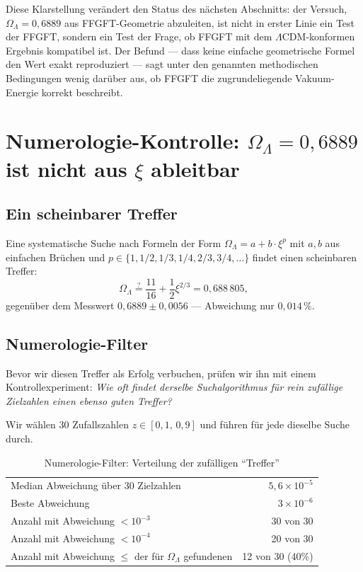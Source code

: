 Diese Klarstellung verändert den Status des nächsten Abschnitts: der Versuch, \(\Omega_\Lambda = 0{,}6889\) aus FFGFT-Geometrie abzuleiten, ist nicht in erster Linie ein Test der FFGFT, sondern ein Test der Frage, ob FFGFT mit dem \(\Lambda\)CDM-konformen Ergebnis kompatibel ist. Der Befund — dass keine einfache geometrische Formel den Wert exakt reproduziert — sagt unter den genannten methodischen Bedingungen wenig darüber aus, ob FFGFT die zugrundeliegende Vakuum-Energie korrekt beschreibt.

\section[Numerologie-Kontrolle: Omega-Lambda nicht aus xi ableitbar]{Numerologie-Kontrolle: \(\Omega_\Lambda = 0{,}6889\) ist nicht aus \(\xi\) ableitbar}
\label{sec:numerologie}

\subsection{Ein scheinbarer Treffer}

Eine systematische Suche nach Formeln der Form \(\Omega_\Lambda = a + b \cdot \xi^p\) mit \(a, b\) aus einfachen Brüchen und \(p \in \{1, 1/2, 1/3, 1/4, 2/3, 3/4, \dots\}\) findet einen scheinbaren Treffer:
\begin{equation}
\Omega_\Lambda \stackrel{?}{=} \frac{11}{16} + \frac{1}{2} \xi^{2/3} = 0{,}688\,805,
\end{equation}
gegenüber dem Messwert \(0{,}6889 \pm 0{,}0056\) — Abweichung nur \(0{,}014\,\%\).

\subsection{Numerologie-Filter}

Bevor wir diesen Treffer als Erfolg verbuchen, prüfen wir ihn mit einem Kontrollexperiment: \emph{Wie oft findet derselbe Suchalgorithmus für rein zufällige Zielzahlen einen ebenso guten Treffer?}

Wir wählen 30 Zufallszahlen \(z \in [0{,}1,\, 0{,}9]\) und führen für jede dieselbe Suche durch.

\begin{table}[h]
\centering
\caption{Numerologie-Filter: Verteilung der zufälligen ``Treffer''}
\begin{tabular}{lr}
\toprule
Median Abweichung über 30 Zielzahlen & \(5{,}6 \times 10^{-5}\) \\
Beste Abweichung & \(3 \times 10^{-6}\) \\
Anzahl mit Abweichung \(< 10^{-3}\) & 30 von 30 \\
Anzahl mit Abweichung \(< 10^{-4}\) & 20 von 30 \\
\midrule
Anzahl mit Abweichung \(\leq\) der für \(\Omega_\Lambda\) gefundenen & 12 von 30 (40\%) \\
\bottomrule
\end{tabular}
\end{table}

